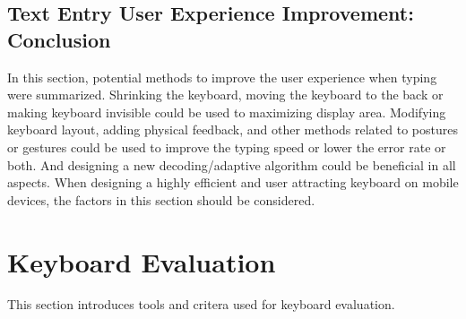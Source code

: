 \documentclass[11pt]{article}
\begin{document}
\subsection{Text Entry User Experience Improvement: Conclusion}
In this section, potential methods to improve the user experience when typing were summarized. Shrinking the keyboard, moving the keyboard to the back or making keyboard invisible could be used to maximizing display area. Modifying keyboard layout, adding physical feedback, and other methods related to postures or gestures could be used to improve the typing speed or lower the error rate or both. And designing a new decoding/adaptive algorithm could be beneficial in all aspects. When designing a highly efficient and user attracting keyboard on mobile devices, the factors in this section should be considered.

\section{Keyboard Evaluation}\label{section-evaluation}
This section introduces tools and critera used for keyboard evaluation.

\newpage


\end{document}
